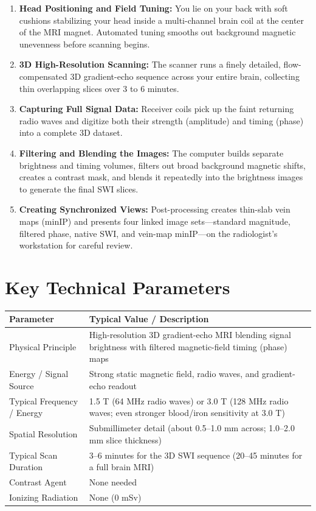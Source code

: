 \begin{enumerate}
    \item \textbf{Head Positioning and Field Tuning:} You lie on your back with soft cushions stabilizing your head inside a multi-channel brain coil at the center of the MRI magnet. Automated tuning smooths out background magnetic unevenness before scanning begins.
    \item \textbf{3D High-Resolution Scanning:} The scanner runs a finely detailed, flow-compensated 3D gradient-echo sequence across your entire brain, collecting thin overlapping slices over 3 to 6 minutes.
    \item \textbf{Capturing Full Signal Data:} Receiver coils pick up the faint returning radio waves and digitize both their strength (amplitude) and timing (phase) into a complete 3D dataset.
    \item \textbf{Filtering and Blending the Images:} The computer builds separate brightness and timing volumes, filters out broad background magnetic shifts, creates a contrast mask, and blends it repeatedly into the brightness images to generate the final SWI slices.
    \item \textbf{Creating Synchronized Views:} Post-processing creates thin-slab vein maps (minIP) and presents four linked image sets---standard magnitude, filtered phase, native SWI, and vein-map minIP---on the radiologist's workstation for careful review.
\end{enumerate}

\section{Key Technical Parameters}

\noindent
\begin{tabularx}{\textwidth}{@{}l X@{}}
\toprule
\textbf{Parameter} & \textbf{Typical Value / Description} \\
\midrule
Physical Principle & High-resolution 3D gradient-echo MRI blending signal brightness with filtered magnetic-field timing (phase) maps \\
Energy / Signal Source & Strong static magnetic field, radio waves, and gradient-echo readout \\
Typical Frequency / Energy & 1.5 T (64 MHz radio waves) or 3.0 T (128 MHz radio waves; even stronger blood/iron sensitivity at 3.0 T) \\
Spatial Resolution & Submillimeter detail (about 0.5--1.0 mm across; 1.0--2.0 mm slice thickness) \\
Typical Scan Duration & 3--6 minutes for the 3D SWI sequence (20--45 minutes for a full brain MRI) \\
Contrast Agent & None needed \\
Ionizing Radiation & None (0 mSv) \\
\bottomrule
\end{tabularx}

